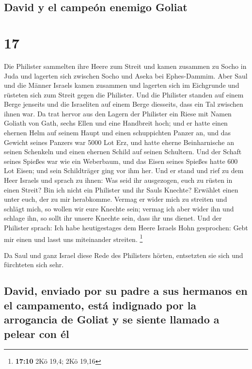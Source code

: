 \hypertarget{david-y-el-campeuxf3n-enemigo-goliat}{%
\subsection{David y el campeón enemigo
Goliat}\label{david-y-el-campeuxf3n-enemigo-goliat}}

\hypertarget{section-16}{%
\section{17}\label{section-16}}

 Die Philister sammelten ihre Heere zum Streit und kamen
zusammen zu Socho in Juda und lagerten sich zwischen Socho und Aseka bei
Ephes-Dammim.  Aber Saul und die Männer Israels kamen
zusammen und lagerten sich im Eichgrunde und rüsteten sich zum Streit
gegen die Philister.  Und die Philister standen auf einem
Berge jenseits und die Israeliten auf einem Berge diesseits, dass ein
Tal zwischen ihnen war.  Da trat hervor aus den Lagern der
Philister ein Riese mit Namen Goliath von Gath, sechs Ellen und eine
Handbreit hoch;  und er hatte einen ehernen Helm auf
seinem Haupt und einen schuppichten Panzer an, und das Gewicht seines
Panzers war 5000 Lot Erz,  und hatte eherne Beinharnische
an seinen Schenkeln und einen ehernen Schild auf seinen Schultern.
 Und der Schaft seines Spießes war wie ein Weberbaum, und
das Eisen seines Spießes hatte 600 Lot Eisen; und sein Schildträger ging
vor ihm her.  Und er stand und rief zu dem Heer Israels
und sprach zu ihnen: Was seid ihr ausgezogen, euch zu rüsten in einen
Streit? Bin ich nicht ein Philister und ihr Sauls Knechte? Erwählet
einen unter euch, der zu mir herabkomme.  Vermag er wider
mich zu streiten und schlägt mich, so wollen wir eure Knechte sein;
vermag ich aber wider ihn und schlage ihn, so sollt ihr unsere Knechte
sein, dass ihr uns dienet.  Und der Philister sprach: Ich
habe heutigestages dem Heere Israels Hohn gesprochen: Gebt mir einen und
lasst uns miteinander streiten. \footnote{\textbf{17:10} 2Kö 19,4; 2Kö
  19,16}

 Da Saul und ganz Israel diese Rede des Philisters
hörten, entsetzten sie sich und fürchteten sich sehr.

\hypertarget{david-enviado-por-su-padre-a-sus-hermanos-en-el-campamento-estuxe1-indignado-por-la-arrogancia-de-goliat-y-se-siente-llamado-a-pelear-con-uxe9l}{%
\subsection{David, enviado por su padre a sus hermanos en el campamento,
está indignado por la arrogancia de Goliat y se siente llamado a pelear
con
él}\label{david-enviado-por-su-padre-a-sus-hermanos-en-el-campamento-estuxe1-indignado-por-la-arrogancia-de-goliat-y-se-siente-llamado-a-pelear-con-uxe9l}}

